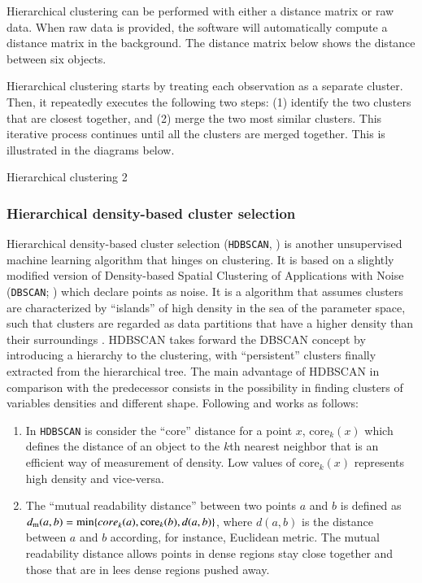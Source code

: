 \documentclass[fleqn,usenatbib]{mnras}
\begin{document}
{Hierarchical clustering can be performed with either a distance matrix or raw data.
When raw data is provided, the software will automatically compute a distance
matrix in the background. The distance matrix below shows the distance between
six objects.

Hierarchical clustering starts by treating each observation as a separate cluster.
Then, it repeatedly executes the following two steps: (1) identify the two
clusters that are closest together, and (2) merge the two most similar clusters.
This iterative process continues until all the clusters are merged together.
This is illustrated in the diagrams below.

Hierarchical clustering 2

\subsubsection{Hierarchical density-based cluster selection}
\label{sec:hdbscan}

Hierarchical density-based cluster selection (\texttt{HDBSCAN}, \citealp{Campello:2013})
is another unsupervised machine learning algorithm that hinges on clustering.
It is based on a slightly modified version of Density-based Spatial
Clustering of Applications with Noise (\texttt{DBSCAN}; \citealp{Ester:1996}) which
declare points as noise. It is a algorithm that assumes clusters are characterized
by ``islands'' of high density in the sea of the parameter space, such
that clusters are regarded as data partitions that have a higher density
than their surroundings \citep{Ntwaetsile:2021}. HDBSCAN takes forward the
DBSCAN concept by introducing a hierarchy to the clustering, with ``persistent''
clusters finally extracted from the hierarchical tree. The main advantage of
HDBSCAN in comparison with the predecessor consists in the possibility in finding
clusters of variables densities and different shape. Following \citet{Malzer:2021}
and \citet{Ntwaetsile:2021} works as follows:

\begin{enumerate}
\item In \texttt{HDBSCAN} is consider the ``core'' distance  for a point $x$, core$_k(x)$
  which defines the distance of an object to the $k$th nearest neighbor that is an
  efficient way of measurement of density. Low values of core$_k(x)$ represents high
  density and vice-versa.

\item The ``mutual readability distance'' between two points $a$ and $b$ is defined as
  $d_{\mathrm{m}}(a, b) = \mathrm{min}{\mathrm\{core}_k(a), \mathrm{core}_k(b), d(a, b)\}$,
  where $d(a, b)$ is the distance between $a$ and $b$ according, for instance,
  Euclidean metric. The mutual readability distance allows points in dense regions
  stay close together and those that are in lees dense regions pushed away.


\end{enumerate}}
\end{document}
